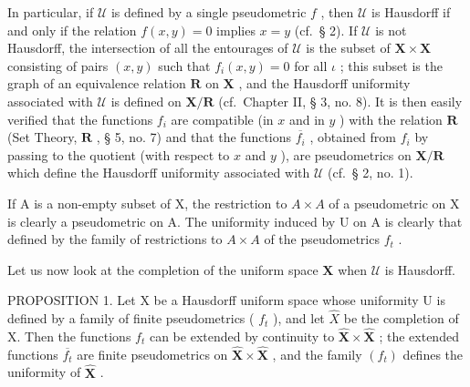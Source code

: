 In particular, if \(\mathcal{U}\) is defined by a single pseudometric \(f\) , then \(\mathcal{U}\) is Hausdorff if and only if the relation \(f(x,y)=0\) implies \(x=y\) (cf.~§ 2). If \(\mathcal{U}\) is not Hausdorff, the intersection of all the entourages of \(\mathcal{U}\) is the subset of \(\mathbf{X} \times \mathbf{X}\) consisting of pairs \((x,y)\) such that \(f_{i}(x,y)=0\) for all \(\iota\) ; this subset is the graph of an equivalence relation \(\mathbf{R}\) on \(\mathbf{X}\) , and the Hausdorff uniformity associated with \(\mathcal{U}\) is defined on \(\mathbf{X}/\mathbf{R}\) (cf.~Chapter II, § 3, no. 8). It is then easily verified that the functions \(f_{i}\) are compatible (in \(x\) and in \(y\) ) with the relation \(\mathbf{R}\) (Set Theory, \(\mathbf{R}\) , § 5, no. 7) and that the functions \(\overline{f_{i}}\) , obtained from \(f_{i}\) by passing to the quotient (with respect to \(x\) and \(y\) ), are pseudometrics on \(\mathbf{X}/\mathbf{R}\) which define the Hausdorff uniformity associated with \(\mathcal{U}\) (cf.~§ 2, no. 1).

If A is a non-empty subset of X, the restriction to \(A \times A\) of a pseudometric on X is clearly a pseudometric on A. The uniformity induced by U on A is clearly that defined by the family of restrictions to \(A \times A\) of the pseudometrics \(f_{t}\) .

Let us now look at the completion of the uniform space \(\mathbf{X}\) when \(\mathcal{U}\) is Hausdorff.

PROPOSITION 1. Let X be a Hausdorff uniform space whose uniformity U is defined by a family of finite pseudometrics ( \(f_{t}\) ), and let \(\hat{X}\) be the completion of X. Then the functions \(f_{t}\) can be extended by continuity to \(\hat{\mathbf{X}} \times \hat{\mathbf{X}}\) ; the extended functions \(\overline{f_t}\) are finite pseudometrics on \(\hat{\mathbf{X}} \times \hat{\mathbf{X}}\) , and the family \((f_{t})\) defines the uniformity of \(\hat{\mathbf{X}}\) .

